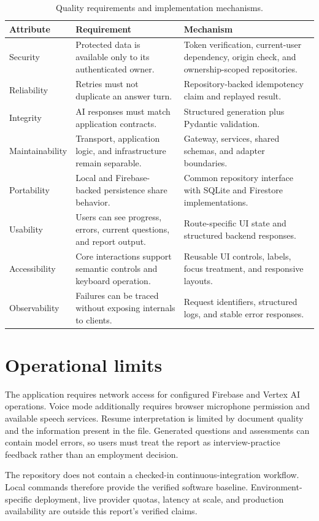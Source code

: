 \begin{table}[htbp]\centering
\caption{Quality requirements and implementation mechanisms.}\label{tab:quality-requirements}
\begin{tabularx}{\textwidth}{p{}YY}\toprule
Attribute & Requirement & Mechanism\\ \midrule
Security & Protected data is available only to its authenticated owner. & Token verification, current-user dependency, origin check, and ownership-scoped repositories.\\
Reliability & Retries must not duplicate an answer turn. & Repository-backed idempotency claim and replayed result.\\
Integrity & AI responses must match application contracts. & Structured generation plus Pydantic validation.\\
Maintainability & Transport, application logic, and infrastructure remain separable. & Gateway, services, shared schemas, and adapter boundaries.\\
Portability & Local and Firebase-backed persistence share behavior. & Common repository interface with SQLite and Firestore implementations.\\
Usability & Users can see progress, errors, current questions, and report output. & Route-specific UI state and structured backend responses.\\
Accessibility & Core interactions support semantic controls and keyboard operation. & Reusable UI controls, labels, focus treatment, and responsive layouts.\\
Observability & Failures can be traced without exposing internals to clients. & Request identifiers, structured logs, and stable error responses.\\
\bottomrule\end{tabularx}
\end{table}

\section{Operational limits}

The application requires network access for configured Firebase and Vertex AI operations. Voice mode additionally requires browser microphone permission and available speech services. Resume interpretation is limited by document quality and the information present in the file. Generated questions and assessments can contain model errors, so users must treat the report as interview-practice feedback rather than an employment decision.

The repository does not contain a checked-in continuous-integration workflow. Local commands therefore provide the verified software baseline. Environment-specific deployment, live provider quotas, latency at scale, and production availability are outside this report's verified claims.
